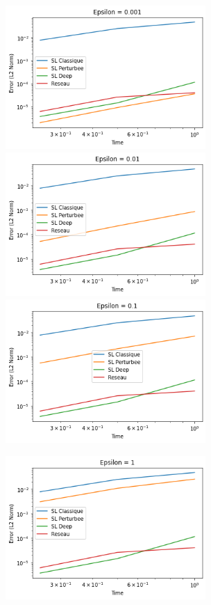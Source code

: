 \documentclass{article}
\begin{document}
\begin{figure}[!h]
    \centering   
    \includegraphics[width=0.68\textwidth]{images/20ep12.png}

    \includegraphics[width=0.68\textwidth]{images/20ep13.png}

    \includegraphics[width=0.68\textwidth]{images/20ep14.png}
\end{figure}

\begin{figure}[!h]
    \centering
    \includegraphics[width=0.68\textwidth]{images/20ep15.png}
\end{figure}
\newpage
\end{document}
